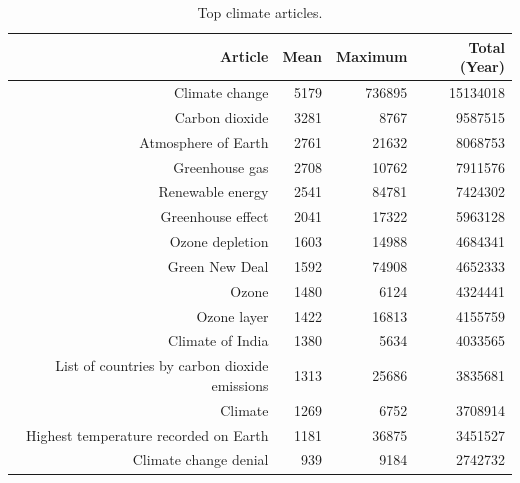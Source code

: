 \begin{table}[t!h]
\centering
\caption{Top climate articles.\label{tab:climate}} 
\begingroup\small
\begin{tabular}{rrrr}
  \toprule
Article & Mean & Maximum & Total (Year) \\ 
  \midrule
Climate change & 5179 & 736895 & 15134018 \\ 
  Carbon dioxide & 3281 & 8767 & 9587515 \\ 
  Atmosphere of Earth & 2761 & 21632 & 8068753 \\ 
  Greenhouse gas & 2708 & 10762 & 7911576 \\ 
  Renewable energy & 2541 & 84781 & 7424302 \\ 
  Greenhouse effect & 2041 & 17322 & 5963128 \\ 
  Ozone depletion & 1603 & 14988 & 4684341 \\ 
  Green New Deal & 1592 & 74908 & 4652333 \\ 
  Ozone & 1480 & 6124 & 4324441 \\ 
  Ozone layer & 1422 & 16813 & 4155759 \\ 
  Climate of India & 1380 & 5634 & 4033565 \\ 
  List of countries by carbon dioxide emissions & 1313 & 25686 & 3835681 \\ 
  Climate & 1269 & 6752 & 3708914 \\ 
  Highest temperature recorded on Earth & 1181 & 36875 & 3451527 \\ 
  Climate change denial & 939 & 9184 & 2742732 \\ 
   \bottomrule
\end{tabular}
\endgroup
\end{table}
